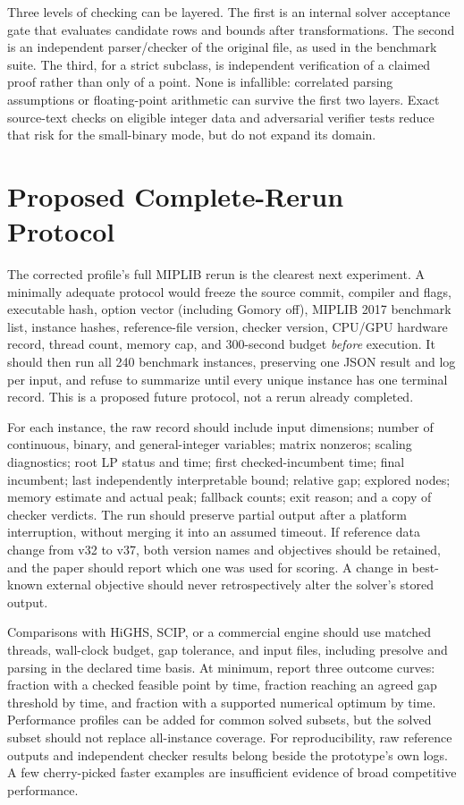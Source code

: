 \documentclass[10pt,a4paper,twocolumn]{article}
\begin{document}
Three levels of checking can be layered. The first is an internal solver acceptance gate that evaluates candidate rows and bounds after transformations. The second is an independent parser/checker of the original file, as used in the benchmark suite. The third, for a strict subclass, is independent verification of a claimed proof rather than only of a point. None is infallible: correlated parsing assumptions or floating-point arithmetic can survive the first two layers. Exact source-text checks on eligible integer data and adversarial verifier tests reduce that risk for the small-binary mode, but do not expand its domain.

\section{Proposed Complete-Rerun Protocol}

The corrected profile's full MIPLIB rerun is the clearest next experiment. A minimally adequate protocol would freeze the source commit, compiler and flags, executable hash, option vector (including Gomory off), MIPLIB 2017 benchmark list, instance hashes, reference-file version, checker version, CPU/GPU hardware record, thread count, memory cap, and 300-second budget \emph{before} execution. It should then run all 240 benchmark instances, preserving one JSON result and log per input, and refuse to summarize until every unique instance has one terminal record. This is a proposed future protocol, not a rerun already completed.

For each instance, the raw record should include input dimensions; number of continuous, binary, and general-integer variables; matrix nonzeros; scaling diagnostics; root LP status and time; first checked-incumbent time; final incumbent; last independently interpretable bound; relative gap; explored nodes; memory estimate and actual peak; fallback counts; exit reason; and a copy of checker verdicts. The run should preserve partial output after a platform interruption, without merging it into an assumed timeout. If reference data change from v32 to v37, both version names and objectives should be retained, and the paper should report which one was used for scoring. A change in best-known external objective should never retrospectively alter the solver's stored output.

Comparisons with HiGHS, SCIP, or a commercial engine should use matched threads, wall-clock budget, gap tolerance, and input files, including presolve and parsing in the declared time basis. At minimum, report three outcome curves: fraction with a checked feasible point by time, fraction reaching an agreed gap threshold by time, and fraction with a supported numerical optimum by time. Performance profiles can be added for common solved subsets, but the solved subset should not replace all-instance coverage. For reproducibility, raw reference outputs and independent checker results belong beside the prototype's own logs. A few cherry-picked faster examples are insufficient evidence of broad competitive performance.
\end{document}
